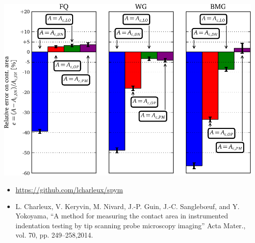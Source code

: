 \documentclass[a0paper,portrait]{baposter}
\begin{document}
\begin{poster}
{}
%
{

\includegraphics[width=\linewidth]{figure_7}


}
{
\begin{itemize}
\item \url{https://github.com/lcharleux/spym}
\item L. Charleux, V. Keryvin, M. Nivard, J.-P. Guin, J.-C. Sanglebœuf, and Y. Yokoyama, “A method for measuring the contact area in instrumented indentation testing by tip scanning probe microscopy imaging” Acta Mater., vol. 70, pp. 249–258,2014.
\end{itemize}



}

\end{poster}
\end{document}
